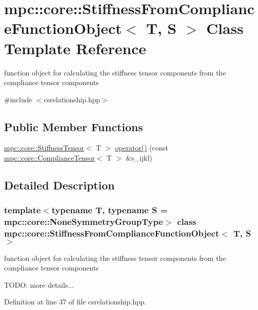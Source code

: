 \hypertarget{structmpc_1_1core_1_1_stiffness_from_compliance_function_object}{}\section{mpc\+:\+:core\+:\+:Stiffness\+From\+Compliance\+Function\+Object$<$ T, S $>$ Class Template Reference}
\label{structmpc_1_1core_1_1_stiffness_from_compliance_function_object}


function object for calculating the stiffness tensor components from the compliance tensor components  




{\ttfamily \#include $<$csrelationship.\+hpp$>$}

\subsection*{Public Member Functions}
\begin{DoxyCompactItemize}
\item 
\mbox{\hyperlink{structmpc_1_1core_1_1_stiffness_tensor}{mpc\+::core\+::\+Stiffness\+Tensor}}$<$ T $>$ \mbox{\hyperlink{structmpc_1_1core_1_1_stiffness_from_compliance_function_object_addf243fde9b4ad271c7ab37bedea199c}{operator()}} (const \mbox{\hyperlink{structmpc_1_1core_1_1_compliance_tensor}{mpc\+::core\+::\+Compliance\+Tensor}}$<$ T $>$ \&s\+\_\+ijkl)
\end{DoxyCompactItemize}


\subsection{Detailed Description}
\subsubsection*{template$<$typename T, typename S = mpc\+::core\+::\+None\+Symmetry\+Group\+Type$>$\newline
class mpc\+::core\+::\+Stiffness\+From\+Compliance\+Function\+Object$<$ T, S $>$}

function object for calculating the stiffness tensor components from the compliance tensor components 

T\+O\+DO\+: more details... 

Definition at line 37 of file csrelationship.\+hpp.



